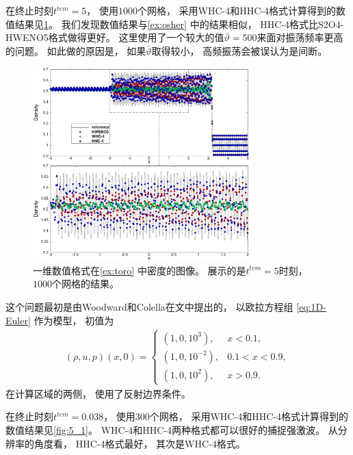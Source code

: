 在终止时刻$t^{tem}=5$，
使用$1000$个网格，
采用WHC-4和HHC-4格式计算得到的数值结果见\cref{fig:4_1}。
我们发现数值结果与\cref{ex:osher} 中的结果相似，
HHC-4格式比S2O4-HWENO5格式做得更好。
这里使用了一个较大的值$\bar\vartheta=500$来面对振荡频率更高的问题。
如此做的原因是，
如果$\bar\vartheta$取得较小，
高频振荡会被误认为是间断。

\begin{figure}[htbp]
  \centering
  \includegraphics[width=0.75\textwidth]{fig/1D/Ex4.pdf}
  \caption{一维数值格式在\cref{ex:toro} 中密度的图像。
    展示的是$t^{tem} = 5$时刻，
    $1000$个网格的结果。
  }
  \label{fig:4_1}
\end{figure}

\begin{example}[一维欧拉方程组的爆炸波问题]
  \label{ex:blast-wave}
  这个问题最初是由Woodward和Colella在文\cite{frontStep-BlastProblem}中提出的，
  以欧拉方程组 \cref{eq:1D-Euler} 作为模型，
  初值为
  \begin{equation}
    \begin{aligned}
      (\rho,u,p)(x,0)=
      \begin{cases}
        (1,0,10^3),    & x<0.1,     \\
        (1,0,10^{-2}), & 0.1<x<0.9, \\
        (1,0,10^2),    & x>0.9.
      \end{cases}
    \end{aligned}
  \end{equation}
  在计算区域的两侧，
  使用了反射边界条件。
\end{example}

在终止时刻$t^{tem}=0.038$，
使用$300$个网格，
采用WHC-4和HHC-4格式计算得到的数值结果见\cref{fig:5_1}。
WHC-4和HHC-4两种格式都可以很好的捕捉强激波。
从分辨率的角度看，
HHC-4格式最好，
其次是WHC-4格式。

